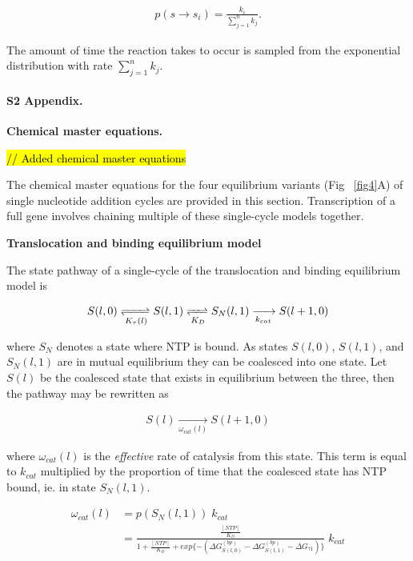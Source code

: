 \documentclass[10pt,letterpaper]{article}
\begin{document}
\begin{eqnarray}
    p(s\rightarrow s_i) = \frac{k_i}{\sum\limits_{j=1}^n k_j}.
\end{eqnarray}

The amount of time the reaction takes to occur is sampled from the exponential distribution with rate $\sum\limits_{j=1}^n k_j$. \\








\paragraph*{S2 Appendix.}
\label{S2_Appendix}
\textbf{ Chemical master equations.}

\hl{// Added chemical master equations}

The chemical master equations for the four equilibrium variants (Fig ~\ref{fig4}A) of single nucleotide addition cycles are provided in this section. Transcription of a full gene involves chaining multiple of these single-cycle models together.



\textbf{Translocation and binding equilibrium model} \par


The state pathway of a single-cycle of the translocation and binding equilibrium model is


\begin{eqnarray}
    S(l,0) \xrightleftharpoons[K_\tau(l)]{} S(l,1) \xrightleftharpoons[K_D]{} S_N(l,1) \xrightarrow[k_{cat}]{} S(l+1,0)
\end{eqnarray}


where $S_N$ denotes a state where NTP is bound. As states $S(l,0)$, $S(l,1)$, and $S_N(l,1)$ are in mutual equilibrium they can be coalesced into one state. Let $S(l)$ be the coalesced state that exists in equilibrium between the three, then the pathway may be rewritten as


\begin{eqnarray}
    S(l) \xrightarrow[\omega_{cat}(l)]{} S(l+1,0)
\end{eqnarray}

where $\omega_{cat}(l)$ is the \textit{effective} rate of catalysis from this state. This term is equal to $k_{cat}$ multiplied by the proportion of time that the coalesced state has NTP bound, ie. in state $S_N(l,1)$.


\begin{align}
    \omega_{cat}(l) &= p( S_N(l,1) ) \; k_{cat} \\
    &= \frac{ \frac{[NTP]}{K_D} }{ 1 + \frac{[NTP]}{K_D} + exp\{ -(\Delta G^{(bp)}_{S(l,0)} -  \Delta G^{(bp)}_{S(l,1)} - \Delta G _{\tau 1} ) \} } \; k_{cat}
\end{align}
\end{document}
